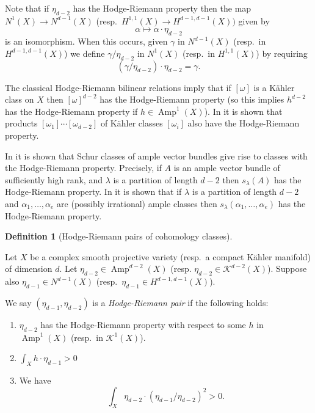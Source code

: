 \documentclass[a4,reqno]{amsart}
\theoremstyle{definition}
\newtheorem{definition}[theorem]{Definition}
\def\cK{\mathcal K}
\DeclareMathOperator{\Amp}{Amp}
\numberwithin{equation}{section}
\begin{document}
Note that if $\eta_{d-2}$ has the Hodge-Riemann property then the map $N^1(X)\to N^{d-1}(X)$  (resp.\  $H^{1,1}(X)\to H^{d-1,d-1}(X))$ given by
$$\alpha\mapsto \alpha\cdot \eta_{d-2}$$ is an isomorphism.  When this occurs, given $\gamma$ in $N^{d-1}(X)$ (resp.\ in  $H^{d-1,d-1}(X)$) we define $\gamma/\eta_{d-2}$ in $N^1(X)$ (resp.\ in  $H^{1,1}(X)$) by requiring
$$(\gamma/\eta_{d-2}) \cdot \eta_{d-2} = \gamma.$$



The classical Hodge-Riemann bilinear relations imply that if $[\omega]$ is a K\"ahler class on $X$ then $[\omega]^{d-2}$ has the Hodge-Riemann property (so this implies $h^{d-2}$ has the Hodge-Riemann property if $h\in \Amp^1(X)$).  In \cite{DinhNguyen06} it is shown that products $[\omega_1] \cdots[\omega_{d-2}]$ of K\"ahler classes $[\omega_i]$ also have the Hodge-Riemann property. 

In \cite{RossToma1} it is shown that Schur classes of ample vector bundles give rise to classes with the Hodge-Riemann property.  Precisely, if $A$ is an ample vector bundle of sufficiently high rank, and $\lambda$ is a partition of length $d-2$ then $s_{\lambda}(A)$ has the Hodge-Riemann property.  In \cite{RossToma3} it is shown that if $\lambda$ is a partition of length $d-2$ and $\alpha_1,\ldots,\alpha_e$ are (possibly irrational) ample classes then $s_{\lambda}(\alpha_1,\ldots,\alpha_e)$ has the Hodge-Riemann property.




\begin{definition}[Hodge-Riemann pairs of cohomology classes]\label{def:algebraicHRpair}

Let $X$ be a complex smooth projective variety (resp.\ a compact K\"ahler manifold) of dimension $d$.  Let $\eta_{d-2}\in \Amp^{d-2}(X)$ (resp.  $\eta_{d-2}\in \cK^{d-2}(X)$).  Suppose also $\eta_{d-1}\in N^{d-1}(X)$ (resp.\ $\eta_{d-1}\in H^{d-1,d-1}(X)$).

We say $(\eta_{d-1},\eta_{d-2})$ is a \textit{Hodge-Riemann pair} if the following holds:

\begin{enumerate}
\item $\eta_{d-2}$ has the Hodge-Riemann property with respect to some $h$ in $\Amp^1(X)$ (resp.\ in $\cK^1(X)$).
\item $\int_X h \cdot \eta_{d-1}>0$
\item We have
$$\int_X \eta_{d-2}\cdot (\eta_{d-1}/\eta_{d-2})^2>0.$$
\end{enumerate}
\end{definition}
\end{document}
